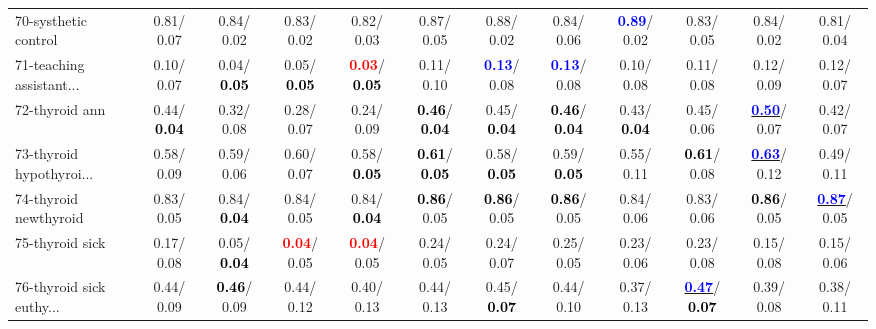 \begin{table}[h]
\begin{center}
{\begin{tabular}{lc|c|c|c|c|c|c|c|c|c|c}
70-systhetic control &   0.81/  0.07 &   0.84/  0.02 &   0.83/  0.02 &   0.82/  0.03 &   0.87/  0.05 &   0.88/  0.02 &   0.84/  0.06 & \textcolor{blue}{\textbf{  0.89}}/  0.02 &   0.83/  0.05 &   0.84/  0.02 &   0.81/  0.04 \\
71-teaching assistant... &   0.10/  0.07 &   0.04/\textcolor{black}{\textbf{  0.05}} &   0.05/\textcolor{black}{\textbf{  0.05}} & \textcolor{red}{\textbf{  0.03}}/\textcolor{black}{\textbf{  0.05}} &   0.11/  0.10 & \textcolor{blue}{\textbf{  0.13}}/  0.08 & \textcolor{blue}{\textbf{  0.13}}/  0.08 &   0.10/  0.08 &   0.11/  0.08 &   0.12/  0.09 &   0.12/  0.07 \\ \hline
72-thyroid ann &   0.44/\textcolor{black}{\textbf{  0.04}} &   0.32/  0.08 &   0.28/  0.07 &   0.24/  0.09 & \textcolor{black}{\textbf{  0.46}}/\textcolor{black}{\textbf{  0.04}} &   0.45/\textcolor{black}{\textbf{  0.04}} & \textcolor{black}{\textbf{  0.46}}/\textcolor{black}{\textbf{  0.04}} &   0.43/\textcolor{black}{\textbf{  0.04}} &   0.45/  0.06 & \underline{\textcolor{blue}{\textbf{  0.50}}}/  0.07 &   0.42/  0.07 \\
73-thyroid hypothyroi... &   0.58/  0.09 &   0.59/  0.06 &   0.60/  0.07 &   0.58/\textcolor{black}{\textbf{  0.05}} & \textcolor{black}{\textbf{  0.61}}/\textcolor{black}{\textbf{  0.05}} &   0.58/\textcolor{black}{\textbf{  0.05}} &   0.59/\textcolor{black}{\textbf{  0.05}} &   0.55/  0.11 & \textcolor{black}{\textbf{  0.61}}/  0.08 & \underline{\textcolor{blue}{\textbf{  0.63}}}/  0.12 &   0.49/  0.11 \\
74-thyroid newthyroid &   0.83/  0.05 &   0.84/\textcolor{black}{\textbf{  0.04}} &   0.84/  0.05 &   0.84/\textcolor{black}{\textbf{  0.04}} & \textcolor{black}{\textbf{  0.86}}/  0.05 & \textcolor{black}{\textbf{  0.86}}/  0.05 & \textcolor{black}{\textbf{  0.86}}/  0.05 &   0.84/  0.06 &   0.83/  0.06 & \textcolor{black}{\textbf{  0.86}}/  0.05 & \underline{\textcolor{blue}{\textbf{  0.87}}}/  0.05 \\
75-thyroid sick &   0.17/  0.08 &   0.05/\textcolor{black}{\textbf{  0.04}} & \textcolor{red}{\textbf{  0.04}}/  0.05 & \textcolor{red}{\textbf{  0.04}}/  0.05 &   0.24/  0.05 &   0.24/  0.07 &   0.25/  0.05 &   0.23/  0.06 &   0.23/  0.08 &   0.15/  0.08 &   0.15/  0.06 \\
76-thyroid sick euthy... &   0.44/  0.09 & \textcolor{black}{\textbf{  0.46}}/  0.09 &   0.44/  0.12 &   0.40/  0.13 &   0.44/  0.13 &   0.45/\textcolor{black}{\textbf{  0.07}} &   0.44/  0.10 &   0.37/  0.13 & \underline{\textcolor{blue}{\textbf{  0.47}}}/\textcolor{black}{\textbf{  0.07}} &   0.39/  0.08 &   0.38/  0.11 \\

\end{tabular}}
\end{center}
\end{table}
